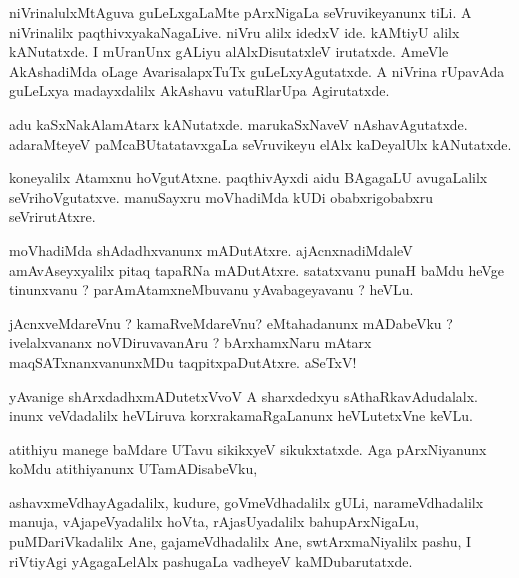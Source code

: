 \documentclass{article}
\begin{document}
\begin{mn}
niVrinalulxMtAguva guLeLxgaLaMte pArxNigaLa seVruvikeyanunx tiLi. A niVrinalilx 
paqthivxyakaNagaLive.  niVru alilx idedxV ide. kAMtiyU alilx kANutatxde.  
I mUranUnx gALiyu alAlxDisutatxleV irutatxde.  AmeVle AkAshadiMda oLage AvarisalapxTuTx 
guLeLxyAgutatxde. A niVrina rUpavAda guLeLxya madayxdalilx AkAshavu vatuRlarUpa Agirutatxde.
\end{mn}

\begin{mn}
adu kaSxNakAlamAtarx kANutatxde. marukaSxNaveV nAshavAgutatxde. adaraMteyeV 
paMcaBUtatatavxgaLa  seVruvikeyu elAlx kaDeyalUlx kANutatxde.
\end{mn}

\begin{mn}
koneyalilx Atamxnu hoVgutAtxne.  paqthivAyxdi aidu BAgagaLU avugaLalilx 
seVrihoVgutatxve.  manuSayxru moVhadiMda kUDi obabxrigobabxru seVrirutAtxre.
\end{mn}

\begin{mn}
moVhadiMda shAdadhxvanunx mADutAtxre.  ajAcnxnadiMdaleV amAvAseyxyalilx pitaq tapaRNa mADutAtxre.  
satatxvanu punaH baMdu heVge tinunxvanu ?  parAmAtamxneMbuvanu yAvabageyavanu ?  heVLu.
\end{mn}

\begin{mn}
jAcnxveMdareVnu ?  kamaRveMdareVnu?  eMtahadanunx mADabeVku ?  ivelalxvananx noVDiruvavanAru ?  
bArxhamxNaru mAtarx maqSATxnanxvanunxMDu taqpitxpaDutAtxre.  aSeTxV!
\end{mn}

\begin{mn}
yAvanige shArxdadhxmADutetxVvoV A sharxdedxyu sAthaRkavAdudalalx.  inunx 
veVdadalilx heVLiruva korxrakamaRgaLanunx heVLutetxVne keVLu.
\end{mn}

\begin{mn}
atithiyu manege baMdare UTavu sikikxyeV sikukxtatxde.  Aga pArxNiyanunx koMdu atithiyanunx UTamADisabeVku,
\end{mn}

\begin{mn}
ashavxmeVdhayAgadalilx, kudure, goVmeVdhadalilx  gULi, narameVdhadalilx manuja, 
vAjapeVyadalilx hoVta, rAjasUyadalilx bahupArxNigaLu, puMDariVkadalilx Ane, gajameVdhadalilx 
Ane, swtArxmaNiyalilx pashu, I riVtiyAgi yAgagaLelAlx pashugaLa vadheyeV kaMDubarutatxde.
\end{mn}
\end{document}
